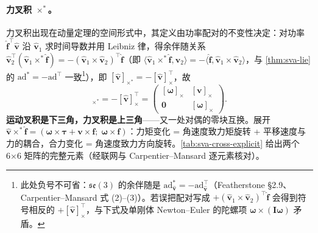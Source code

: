 \paragraph{力叉积 $\times^*$。}
力叉积出现在动量定理的空间形式中，其定义由功率配对的不变性决定：对功率 $\hat{\mathbf f}^\top\hat{\mathbf v}$ 沿 $\hat{\mathbf v}_1$ 求时间导数并用 Leibniz 律，得余伴随关系 $\hat{\mathbf v}_2^\top(\hat{\mathbf v}_1\times^*\hat{\mathbf f})=-(\hat{\mathbf v}_1\times\hat{\mathbf v}_2)^\top\hat{\mathbf f}$（即 $\langle\hat{\mathbf v}_1\times^*\hat{\mathbf f},\hat{\mathbf v}_2\rangle=-\langle\hat{\mathbf f},\hat{\mathbf v}_1\times\hat{\mathbf v}_2\rangle$，与 \cref{thm:sva-lie} 的 $\mathrm{ad}^*=-\mathrm{ad}^\top$ 一致\footnote{此处负号不可省：$\mathfrak{se}(3)$ 的余伴随是 $\mathrm{ad}^*_{\hat{\mathbf v}}=-\mathrm{ad}_{\hat{\mathbf v}}^\top$（Featherstone\cite{featherstone2008rigid} \S2.9、Carpentier--Mansard\cite{carpentier2018analytical} 式 (2)–(3)）。若误把配对写成 $+(\hat{\mathbf v}_1\times\hat{\mathbf v}_2)^\top\hat{\mathbf f}$ 会得到符号相反的 $+[\hat{\mathbf v}]_\times^\top$，与下式及单刚体 Newton--Euler 的陀螺项 $\boldsymbol\omega\times(\mathbf I\boldsymbol\omega)$ 矛盾。}），即 $[\hat{\mathbf v}]_{\times^*}=-[\hat{\mathbf v}]_\times^\top$，故
\begin{equation}
  [\hat{\mathbf v}]_{\times^*}=-[\hat{\mathbf v}]_\times^\top=\begin{pmatrix}[\boldsymbol\omega]_\times&[\mathbf v]_\times\\ \mathbf 0&[\boldsymbol\omega]_\times\end{pmatrix}.
  \label{eq:sva-crf}
\end{equation}
\textbf{运动叉积是下三角，力叉积是上三角}——又一处对偶的零块互换。展开 $\hat{\mathbf v}\times^*\hat{\mathbf f}=(\boldsymbol\omega\times\boldsymbol\tau+\mathbf v\times\mathbf f;\;\boldsymbol\omega\times\mathbf f)$：力矩变化 = 角速度致力矩旋转 + 平移速度与力的耦合，合力变化 = 角速度致力方向旋转。\cref{tab:sva-cross-explicit} 给出两个 6×6 矩阵的完整元素（经联网与 Carpentier--Mansard\cite{carpentier2018analytical} 逐元素核对）。

